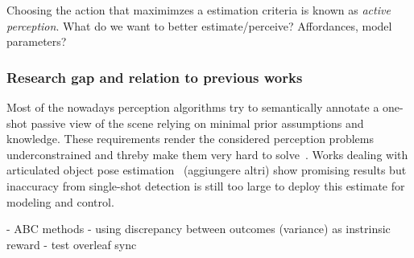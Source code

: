 Choosing the action that maximimzes a estimation criteria is known as \emph{active perception}. 
What do we want to better estimate/perceive? Affordances, model parameters?
 
\subsubsection{Research gap and relation to previous works}
Most of the nowadays perception algorithms try to semantically annotate a one-shot passive view of the scene relying on minimal prior assumptions and knowledge. These requirements render the considered perception problems underconstrained and threby make them very hard to solve~\cite{bohg2017interactive}.   
Works dealing with articulated object pose estimation~\cite{li2020category} (aggiungere altri) show promising results but inaccuracy from single-shot detection is still too large to deploy this estimate for modeling and control. 

- ABC methods 
- \cite{pathak2019self} using discrepancy between outcomes (variance) as instrinsic reward
- test overleaf sync
